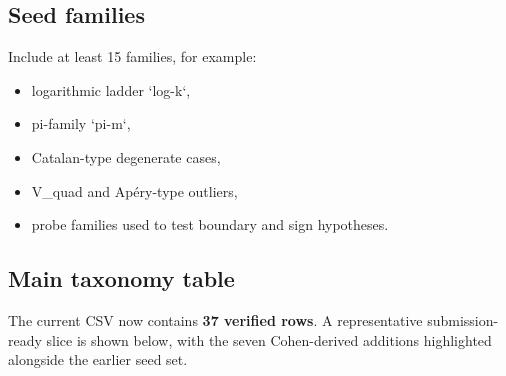 \documentclass[11pt]{article}
\begin{document}
\subsection{Seed families}
Include at least 15 families, for example:
\begin{itemize}
  \item logarithmic ladder `log-k`,
  \item pi-family `pi-m`,
  \item Catalan-type degenerate cases,
  \item V\_quad and Ap\'ery-type outliers,
  \item probe families used to test boundary and sign hypotheses.
\end{itemize}

\subsection{Main taxonomy table}
The current CSV now contains \textbf{37 verified rows}. A representative submission-ready slice is shown below, with the seven Cohen-derived additions highlighted alongside the earlier seed set.
\end{document}

